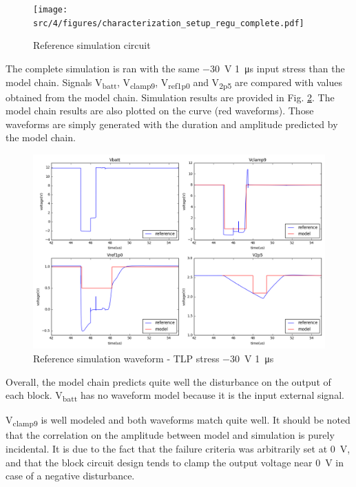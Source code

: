 \begin{figure}[!h]
  \centering
  \texttt{[image: src/4/figures/characterization\_setup\_regu\_complete.pdf]}
  \caption{Reference simulation circuit}
  \label{fig:reference_simu_circuit}
\end{figure}

The complete simulation is ran with the same \SI{-30}{\volt} \SI{1}{\micro\second} input stress than the model chain.
Signals V\textsubscript{batt}, V\textsubscript{clamp9}, V\textsubscript{ref1p0} and V\textsubscript{2p5} are compared with values obtained from the model chain.
Simulation results are provided in Fig. \ref{fig:reference_simu}.
The model chain results are also plotted on the curve (red waveforms).
Those waveforms are simply generated with the duration and amplitude predicted by the model chain.

\begin{figure}[!h]
  \centering
  \includegraphics[width=\textwidth]{src/4/figures/total_simulation_30V_1u.png}
  \caption{Reference simulation waveform - TLP stress \SI{-30}{\volt} \SI{1}{\micro\second}}
  \label{fig:reference_simu}
\end{figure}

Overall, the model chain predicts quite well the disturbance on the output of each block.
V\textsubscript{batt} has no waveform model because it is the input external signal.

V\textsubscript{clamp9} is well modeled and both waveforms match quite well.
It should be noted that the correlation on the amplitude between model and simulation is purely incidental.
It is due to the fact that the failure criteria was arbitrarily set at \SI{0}{\volt}, and that the block circuit design tends to clamp the output voltage near \SI{0}{\volt} in case of a negative disturbance.

